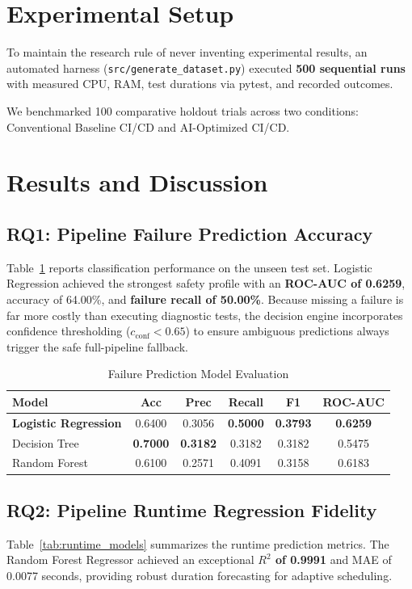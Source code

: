 \documentclass[conference]{IEEEtran}
\begin{document}
\section{Experimental Setup}
To maintain the research rule of never inventing experimental results, an automated harness (\texttt{src/generate\_dataset.py}) executed \textbf{500 sequential runs} with measured CPU, RAM, test durations via pytest, and recorded outcomes. 

We benchmarked 100 comparative holdout trials across two conditions: Conventional Baseline CI/CD and AI-Optimized CI/CD.

\section{Results and Discussion}

\subsection{RQ1: Pipeline Failure Prediction Accuracy}
Table~\ref{tab:failure_models} reports classification performance on the unseen test set. Logistic Regression achieved the strongest safety profile with an \textbf{ROC-AUC of 0.6259}, accuracy of 64.00\%, and \textbf{failure recall of 50.00\%}. Because missing a failure is far more costly than executing diagnostic tests, the decision engine incorporates confidence thresholding ($c_{\text{conf}} < 0.65$) to ensure ambiguous predictions always trigger the safe full-pipeline fallback.

\begin{table}[htbp]
\caption{Failure Prediction Model Evaluation}
\begin{center}
\begin{tabular}{lccccc}
\toprule
\textbf{Model} & \textbf{Acc} & \textbf{Prec} & \textbf{Recall} & \textbf{F1} & \textbf{ROC-AUC} \\
\midrule
\textbf{Logistic Regression} & 0.6400 & 0.3056 & \textbf{0.5000} & \textbf{0.3793} & \textbf{0.6259} \\
Decision Tree & \textbf{0.7000} & \textbf{0.3182} & 0.3182 & 0.3182 & 0.5475 \\
Random Forest & 0.6100 & 0.2571 & 0.4091 & 0.3158 & 0.6183 \\
\bottomrule
\end{tabular}
\label{tab:failure_models}
\end{center}
\end{table}

\subsection{RQ2: Pipeline Runtime Regression Fidelity}
Table~\ref{tab:runtime_models} summarizes the runtime prediction metrics. The Random Forest Regressor achieved an exceptional \textbf{$R^2$ of 0.9991} and MAE of 0.0077 seconds, providing robust duration forecasting for adaptive scheduling.
\end{document}

